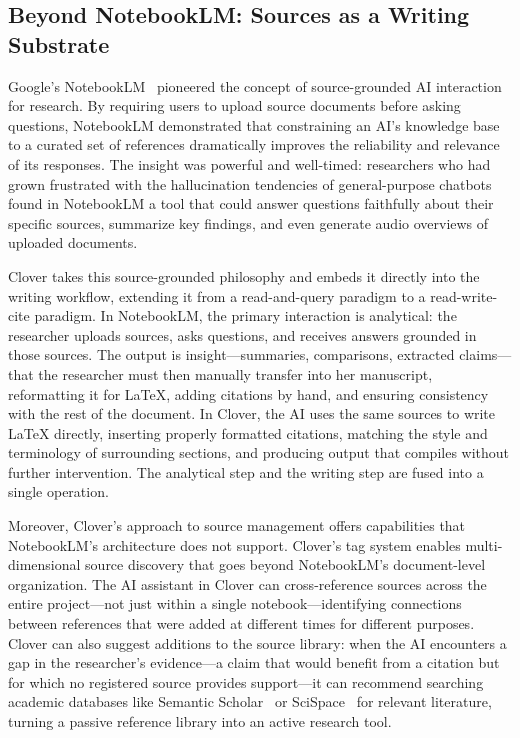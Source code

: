 \documentclass[a4paper,11pt]{article}
\begin{document}
\subsection{Beyond NotebookLM: Sources as a Writing Substrate}

Google's NotebookLM~\cite{NotebookLM} pioneered the concept of source-grounded AI interaction for research. By requiring users to upload source documents before asking questions, NotebookLM demonstrated that constraining an AI's knowledge base to a curated set of references dramatically improves the reliability and relevance of its responses. The insight was powerful and well-timed: researchers who had grown frustrated with the hallucination tendencies of general-purpose chatbots found in NotebookLM a tool that could answer questions faithfully about their specific sources, summarize key findings, and even generate audio overviews of uploaded documents.

Clover takes this source-grounded philosophy and embeds it directly into the writing workflow, extending it from a read-and-query paradigm to a read-write-cite paradigm. In NotebookLM, the primary interaction is analytical: the researcher uploads sources, asks questions, and receives answers grounded in those sources. The output is insight---summaries, comparisons, extracted claims---that the researcher must then manually transfer into her manuscript, reformatting it for \LaTeX{}, adding citations by hand, and ensuring consistency with the rest of the document. In Clover, the AI uses the same sources to write \LaTeX{} directly, inserting properly formatted citations, matching the style and terminology of surrounding sections, and producing output that compiles without further intervention. The analytical step and the writing step are fused into a single operation.

Moreover, Clover's approach to source management offers capabilities that NotebookLM's architecture does not support. Clover's tag system enables multi-dimensional source discovery that goes beyond NotebookLM's document-level organization. The AI assistant in Clover can cross-reference sources across the entire project---not just within a single notebook---identifying connections between references that were added at different times for different purposes. Clover can also suggest additions to the source library: when the AI encounters a gap in the researcher's evidence---a claim that would benefit from a citation but for which no registered source provides support---it can recommend searching academic databases like Semantic Scholar~\cite{Elicit} or SciSpace~\cite{SciSpace} for relevant literature, turning a passive reference library into an active research tool.
\end{document}
